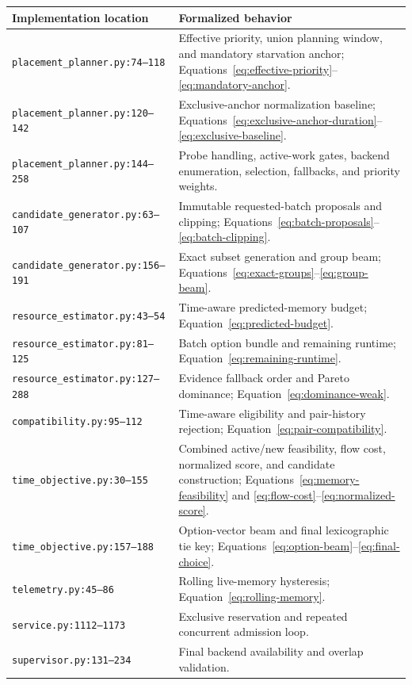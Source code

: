 \documentclass[11pt]{article}
\newcommand{\code}[1]{\textcolor{codeblue}{\texttt{#1}}}
\begin{document}
\begin{longtable}{p{}p{}}
\toprule
Implementation location & Formalized behavior \\
\midrule
\endhead
\code{placement\_planner.py:74--118} & Effective priority, union planning window, and mandatory starvation anchor; Equations~\eqref{eq:effective-priority}--\eqref{eq:mandatory-anchor}. \\
\code{placement\_planner.py:120--142} & Exclusive-anchor normalization baseline; Equations~\eqref{eq:exclusive-anchor-duration}--\eqref{eq:exclusive-baseline}. \\
\code{placement\_planner.py:144--258} & Probe handling, active-work gates, backend enumeration, selection, fallbacks, and priority weights. \\
\code{candidate\_generator.py:63--107} & Immutable requested-batch proposals and clipping; Equations~\eqref{eq:batch-proposals}--\eqref{eq:batch-clipping}. \\
\code{candidate\_generator.py:156--191} & Exact subset generation and group beam; Equations~\eqref{eq:exact-groups}--\eqref{eq:group-beam}. \\
\code{resource\_estimator.py:43--54} & Time-aware predicted-memory budget; Equation~\eqref{eq:predicted-budget}. \\
\code{resource\_estimator.py:81--125} & Batch option bundle and remaining runtime; Equation~\eqref{eq:remaining-runtime}. \\
\code{resource\_estimator.py:127--288} & Evidence fallback order and Pareto dominance; Equation~\eqref{eq:dominance-weak}. \\
\code{compatibility.py:95--112} & Time-aware eligibility and pair-history rejection; Equation~\eqref{eq:pair-compatibility}. \\
\code{time\_objective.py:30--155} & Combined active/new feasibility, flow cost, normalized score, and candidate construction; Equations~\eqref{eq:memory-feasibility} and \eqref{eq:flow-cost}--\eqref{eq:normalized-score}. \\
\code{time\_objective.py:157--188} & Option-vector beam and final lexicographic tie key; Equations~\eqref{eq:option-beam}--\eqref{eq:final-choice}. \\
\code{telemetry.py:45--86} & Rolling live-memory hysteresis; Equation~\eqref{eq:rolling-memory}. \\
\code{service.py:1112--1173} & Exclusive reservation and repeated concurrent admission loop. \\
\code{supervisor.py:131--234} & Final backend availability and overlap validation. \\
\bottomrule
\end{longtable}
\end{document}
